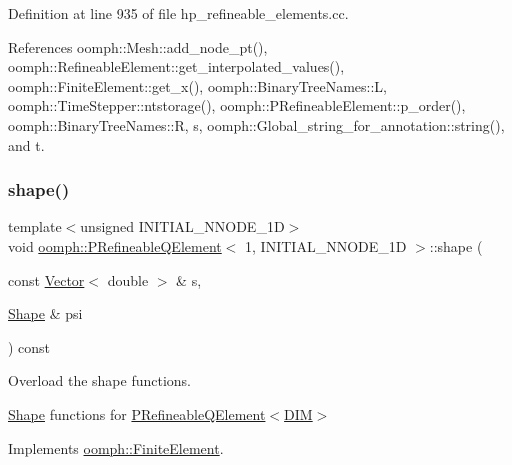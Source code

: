 Definition at line 935 of file hp\+\_\+refineable\+\_\+elements.\+cc.



References oomph\+::\+Mesh\+::add\+\_\+node\+\_\+pt(), oomph\+::\+Refineable\+Element\+::get\+\_\+interpolated\+\_\+values(), oomph\+::\+Finite\+Element\+::get\+\_\+x(), oomph\+::\+Binary\+Tree\+Names\+::L, oomph\+::\+Time\+Stepper\+::ntstorage(), oomph\+::\+P\+Refineable\+Element\+::p\+\_\+order(), oomph\+::\+Binary\+Tree\+Names\+::R, s, oomph\+::\+Global\+\_\+string\+\_\+for\+\_\+annotation\+::string(), and t.

\mbox{\label{classoomph_1_1PRefineableQElement_3_011_00_01INITIAL__NNODE__1D_01_4_a3b9d39b32b0f3720991ba2e690c0c563}} 
\subsubsection{\texorpdfstring{shape()}{shape()}}
{\footnotesize\ttfamily template$<$unsigned I\+N\+I\+T\+I\+A\+L\+\_\+\+N\+N\+O\+D\+E\+\_\+1D$>$ \\
void \hyperlink{classoomph_1_1PRefineableQElement}{oomph\+::\+P\+Refineable\+Q\+Element}$<$ 1, I\+N\+I\+T\+I\+A\+L\+\_\+\+N\+N\+O\+D\+E\+\_\+1D $>$\+::shape (\begin{DoxyParamCaption}\item[{const \hyperlink{classoomph_1_1Vector}{Vector}$<$ double $>$ \&}]{s,  }\item[{\hyperlink{classoomph_1_1Shape}{Shape} \&}]{psi }\end{DoxyParamCaption}) const\hspace{0.3cm}{\ttfamily [virtual]}}



Overload the shape functions. 

\hyperlink{classoomph_1_1Shape}{Shape} functions for \hyperlink{classoomph_1_1PRefineableQElement}{P\+Refineable\+Q\+Element$<$\+D\+I\+M$>$} 

Implements \hyperlink{classoomph_1_1FiniteElement_a58a25b6859ddd43b7bfe64a19fee5023}{oomph\+::\+Finite\+Element}.



